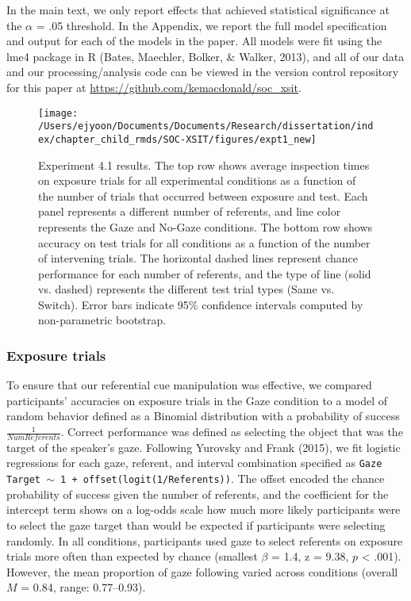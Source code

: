 \documentclass[oneside]{report}
\begin{document}
In the main text, we only report effects that achieved statistical
significance at the \(\alpha\) = .05 threshold. In the Appendix, we
report the full model specification and output for each of the models in
the paper. All models were fit using the lme4 package in R (Bates,
Maechler, Bolker, \& Walker, 2013), and all of our data and our
processing/analysis code can be viewed in the version control repository
for this paper at \url{https://github.com/kemacdonald/soc_xsit}.
\begin{figure}[!t]

{\centering \texttt{[image: /Users/ejyoon/Documents/Documents/Research/dissertation/index/chapter\_child\_rmds/SOC-XSIT/figures/expt1\_new]} 

}

\caption[Experiment 4.1 results.]{Experiment 4.1 results. The top row shows average inspection times on exposure trials for all experimental conditions as a function of the number of trials that occurred between exposure and test. Each panel represents a different number of referents, and line color represents the Gaze and No-Gaze conditions. The bottom row shows accuracy on test trials for all conditions as a function of the number of intervening trials. The horizontal dashed lines represent chance performance for each number of referents, and the type of line (solid vs. dashed) represents the different test trial types (Same vs. Switch). Error bars indicate 95\% confidence intervals computed by non-parametric bootstrap.}\label{fig:expt1-plot}
\end{figure}
\subsubsection{Exposure trials}\label{exposure-trials}

To ensure that our referential cue manipulation was effective, we
compared participants' accuracies on exposure trials in the Gaze
condition to a model of random behavior defined as a Binomial
distribution with a probability of success \(\frac{1}{Num Referents}\).
Correct performance was defined as selecting the object that was the
target of the speaker's gaze. Following Yurovsky and Frank (2015), we
fit logistic regressions for each gaze, referent, and interval
combination specified as
\texttt{Gaze Target $\sim$ 1 + offset(logit(1/Referents))}. The offset
encoded the chance probability of success given the number of referents,
and the coefficient for the intercept term shows on a log-odds scale how
much more likely participants were to select the gaze target than would
be expected if participants were selecting randomly. In all conditions,
participants used gaze to select referents on exposure trials more often
than expected by chance (smallest \(\beta\) = 1.4, z = 9.38, \(p\)
\textless{} .001). However, the mean proportion of gaze following varied
across conditions (overall \(M\) = 0.84, range: 0.77--0.93).
\end{document}

